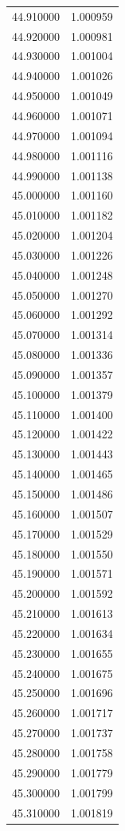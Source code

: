 \begin{tabular}{rr}
44.910000 & 1.000959 \\
44.920000 & 1.000981 \\
44.930000 & 1.001004 \\
44.940000 & 1.001026 \\
44.950000 & 1.001049 \\
44.960000 & 1.001071 \\
44.970000 & 1.001094 \\
44.980000 & 1.001116 \\
44.990000 & 1.001138 \\
45.000000 & 1.001160 \\
45.010000 & 1.001182 \\
45.020000 & 1.001204 \\
45.030000 & 1.001226 \\
45.040000 & 1.001248 \\
45.050000 & 1.001270 \\
45.060000 & 1.001292 \\
45.070000 & 1.001314 \\
45.080000 & 1.001336 \\
45.090000 & 1.001357 \\
45.100000 & 1.001379 \\
45.110000 & 1.001400 \\
45.120000 & 1.001422 \\
45.130000 & 1.001443 \\
45.140000 & 1.001465 \\
45.150000 & 1.001486 \\
45.160000 & 1.001507 \\
45.170000 & 1.001529 \\
45.180000 & 1.001550 \\
45.190000 & 1.001571 \\
45.200000 & 1.001592 \\
45.210000 & 1.001613 \\
45.220000 & 1.001634 \\
45.230000 & 1.001655 \\
45.240000 & 1.001675 \\
45.250000 & 1.001696 \\
45.260000 & 1.001717 \\
45.270000 & 1.001737 \\
45.280000 & 1.001758 \\
45.290000 & 1.001779 \\
45.300000 & 1.001799 \\
45.310000 & 1.001819 \\

\end{tabular}
